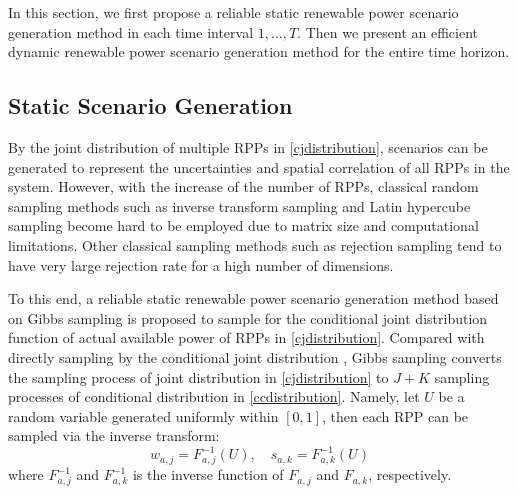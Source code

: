 In this section, we first propose a reliable static renewable power scenario generation method in each time interval $1,\dots,T$. Then we present an efficient dynamic renewable power scenario generation method for the entire time horizon.

\subsection {Static Scenario Generation}

By the joint distribution of multiple RPPs in \eqref{cjdistribution}, scenarios can be generated to represent the uncertainties and spatial correlation of all RPPs in the system. However, with the increase of the number of RPPs, classical random sampling methods such as inverse transform sampling and Latin hypercube sampling \cite{L_sampling} become hard to be employed due to matrix size and computational limitations. Other classical sampling methods such as rejection sampling tend to have very large rejection rate for a high number of dimensions.

To this end, a reliable static renewable power scenario generation method based on Gibbs sampling \cite{Gibbs} is proposed to sample for the conditional joint distribution function of actual available power of RPPs in \eqref{cjdistribution}. Compared with directly sampling by the conditional joint distribution \cite{copula_Zhang}, Gibbs sampling converts the sampling process of joint distribution in \eqref{cjdistribution} to $J+K$ sampling processes of conditional distribution in \eqref{ccdistribution}. Namely, let $U$ be a random variable generated uniformly within $[0,1]$, then each RPP can be sampled via the inverse transform:
\begin{equation} \label{inversesampling}
w_{a,j}=F_{a,j}^{-1}(U),\quad s_{a,k}=F_{a,k}^{-1}(U)
\end{equation}
where $F_{a,j}^{-1}$ and $F_{a,k}^{-1}$ is the inverse function of $F_{a,j}$ and $F_{a,k}$, respectively.

